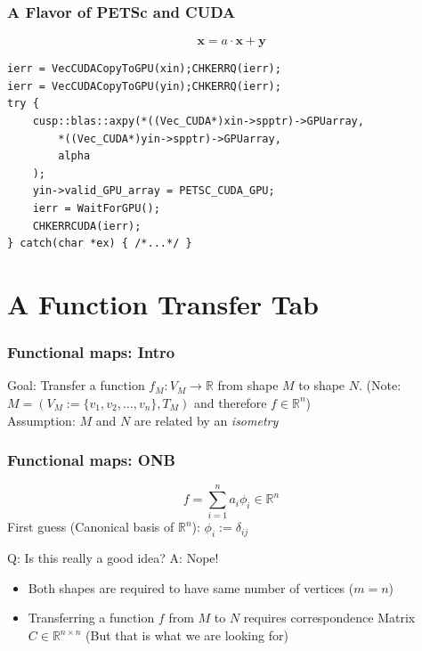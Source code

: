 \documentclass[compress]{beamer}
\begin{document}
\begin{frame}[fragile]
\frametitle{A Flavor of PETSc and CUDA}
$$
	\mathbf{x} = a \cdot \mathbf{x} + \mathbf{y}
$$
\begin{lstlisting}
ierr = VecCUDACopyToGPU(xin);CHKERRQ(ierr);
ierr = VecCUDACopyToGPU(yin);CHKERRQ(ierr);
try {
    cusp::blas::axpy(*((Vec_CUDA*)xin->spptr)->GPUarray,
        *((Vec_CUDA*)yin->spptr)->GPUarray,
        alpha
    );
    yin->valid_GPU_array = PETSC_CUDA_GPU;
    ierr = WaitForGPU();
    CHKERRCUDA(ierr);
} catch(char *ex) { /*...*/ }
\end{lstlisting}

\end{frame}

\section{A Function Transfer Tab}

\begin{frame}
\frametitle{Functional maps: Intro}
Goal: Transfer a function $f_M:V_M \to \mathbb{R}$ from shape $M$ to shape $N$. (Note: $M = (V_M:=\{v_1, v_2, \dots, v_n\}, T_M)$ and therefore $f \in \mathbb{R}^n$)\\
Assumption: $M$ and $N$ are related by an \emph{isometry}
\end{frame}

\begin{frame}[fragile]
\frametitle{Functional maps: ONB}
$$
	f = \sum_{i=1}^{n} a_i\phi_i \in \mathbb{R}^n
$$
First guess (Canonical basis of $\mathbb{R}^n$): $\phi_i := \delta_{ij}$ \\

\begin{block}{}
Q: Is this really a good idea? A: Nope!
\begin{itemize}
	\item Both shapes are required to have same number of vertices ($m=n$)
	\item Transferring a function $f$ from $M$ to $N$ requires correspondence Matrix $C\in \mathbb{R}^{n \times n}$ (But that is what we are looking for)
\end{itemize}
\end{block}
\end{frame}
\end{document}
